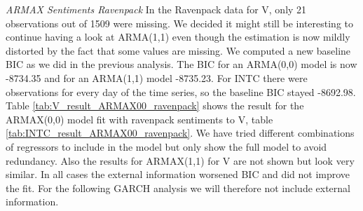 \begin{table}[h]
    \centering
    
    \caption{}
    \label{tab:V_result_ARMAX00_sentiment}
\end{table}{}

\begin{table}[h!]
    \centering
    
    \caption{}
    \label{tab:INTC_result_ARMAX00_sentiment}
\end{table}{}

\textit{ARMAX Sentiments Ravenpack}
In the Ravenpack data for V, only 21 observations out of 1509 were missing. We decided it might still be interesting to continue having a look at ARMA(1,1) even though the estimation is now mildly distorted by the fact that some values are missing. We computed a new baseline BIC as we did in the previous analysis. The BIC for an ARMA(0,0) model is now -8734.35 and for an ARMA(1,1) model -8735.23. For INTC there were observations for every day of the time series, so the baseline BIC stayed -8692.98. Table \ref{tab:V_result_ARMAX00_ravenpack} shows the result for the ARMAX(0,0) model fit with ravenpack sentiments to V, table \ref{tab:INTC_result_ARMAX00_ravenpack}. We have tried different combinations of regressors to include in the model but only show the full model to avoid redundancy. Also the results for ARMAX(1,1) for V are not shown but look very similar. In all cases the external information worsened BIC and did not improve the fit. For the following GARCH analysis we will therefore not include external information. 

\begin{table}[h]
    \centering
    
    \caption{}
    \label{tab:V_result_ARMAX00_ravenpack}
\end{table}{}

\begin{table}[h]
    \centering
    
    \caption{}
    \label{tab:V_result_ARMAX00_sentiment}
\end{table}{}

\begin{table}[h]
    \centering
    
    \caption{}
    \label{tab:INTC_result_ARMAX00_ravenpack}
\end{table}{}

